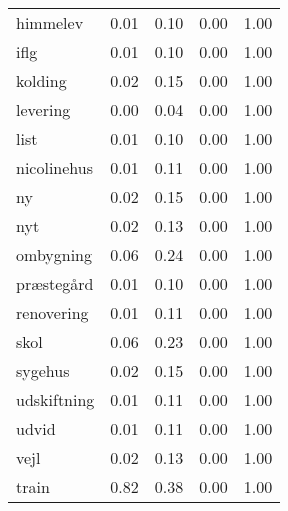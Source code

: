 \begin{longtable}{lllll}
himmelev & 0.01 & 0.10 & 0.00 & 1.00 \\
iflg & 0.01 & 0.10 & 0.00 & 1.00 \\
kolding & 0.02 & 0.15 & 0.00 & 1.00 \\
levering & 0.00 & 0.04 & 0.00 & 1.00 \\
list & 0.01 & 0.10 & 0.00 & 1.00 \\
nicolinehus & 0.01 & 0.11 & 0.00 & 1.00 \\
ny & 0.02 & 0.15 & 0.00 & 1.00 \\
nyt & 0.02 & 0.13 & 0.00 & 1.00 \\
ombygning & 0.06 & 0.24 & 0.00 & 1.00 \\
præstegård & 0.01 & 0.10 & 0.00 & 1.00 \\
renovering & 0.01 & 0.11 & 0.00 & 1.00 \\
skol & 0.06 & 0.23 & 0.00 & 1.00 \\
sygehus & 0.02 & 0.15 & 0.00 & 1.00 \\
udskiftning & 0.01 & 0.11 & 0.00 & 1.00 \\
udvid & 0.01 & 0.11 & 0.00 & 1.00 \\
vejl & 0.02 & 0.13 & 0.00 & 1.00 \\
train & 0.82 & 0.38 & 0.00 & 1.00 \\
\end{longtable}
